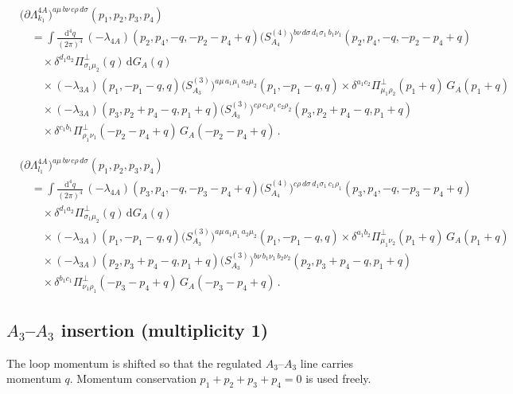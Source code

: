 \documentclass[11pt,a4paper]{article}
\begin{document}
\begin{align}
&\bigl(\partial\Lambda^{4A}_{k_1}\bigr)^{a\mu\,b\nu\,c\rho\,d\sigma}(p_1,p_2,p_3,p_4)
\nonumber\\
&\quad=
\int\frac{\mathrm{d}^4q}{(2\pi)^4}\,
(-\lambda_{4A})(p_2,p_4,-q,-p_2-p_4+q)
\bigl(S^{(4)}_{A_4}\bigr)^{b\nu\,d\sigma\,d_1\sigma_1\,b_1\nu_1}(p_2,p_4,-q,-p_2-p_4+q)
\nonumber\\
&\qquad\times
\delta^{d_1a_2}\Pi^\perp_{\sigma_1\mu_2}(q)\,\mathrm{d}G_A(q)
\nonumber\\
&\qquad\times
(-\lambda_{3A})(p_1,-p_1-q,q)
\bigl(S^{(3)}_{A_3}\bigr)^{a\mu\,a_1\mu_1\,a_2\mu_2}(p_1,-p_1-q,q)
\times
\delta^{a_1c_2}\Pi^\perp_{\mu_1\rho_2}(p_1+q)\,G_A(p_1+q)
\nonumber\\
&\qquad\times
(-\lambda_{3A})(p_3,p_2+p_4-q,p_1+q)
\bigl(S^{(3)}_{A_3}\bigr)^{c\rho\,c_1\rho_1\,c_2\rho_2}(p_3,p_2+p_4-q,p_1+q)
\nonumber\\
&\qquad\times
\delta^{c_1b_1}\Pi^\perp_{\rho_1\nu_1}(-p_2-p_4+q)\,G_A(-p_2-p_4+q)\,.
\label{eq:dLam-k1}
\end{align}

\begin{align}
&\bigl(\partial\Lambda^{4A}_{l_1}\bigr)^{a\mu\,b\nu\,c\rho\,d\sigma}(p_1,p_2,p_3,p_4)
\nonumber\\
&\quad=
\int\frac{\mathrm{d}^4q}{(2\pi)^4}\,
(-\lambda_{4A})(p_3,p_4,-q,-p_3-p_4+q)
\bigl(S^{(4)}_{A_4}\bigr)^{c\rho\,d\sigma\,d_1\sigma_1\,c_1\rho_1}(p_3,p_4,-q,-p_3-p_4+q)
\nonumber\\
&\qquad\times
\delta^{d_1a_2}\Pi^\perp_{\sigma_1\mu_2}(q)\,\mathrm{d}G_A(q)
\nonumber\\
&\qquad\times
(-\lambda_{3A})(p_1,-p_1-q,q)
\bigl(S^{(3)}_{A_3}\bigr)^{a\mu\,a_1\mu_1\,a_2\mu_2}(p_1,-p_1-q,q)
\times
\delta^{a_1b_2}\Pi^\perp_{\mu_1\nu_2}(p_1+q)\,G_A(p_1+q)
\nonumber\\
&\qquad\times
(-\lambda_{3A})(p_2,p_3+p_4-q,p_1+q)
\bigl(S^{(3)}_{A_3}\bigr)^{b\nu\,b_1\nu_1\,b_2\nu_2}(p_2,p_3+p_4-q,p_1+q)
\nonumber\\
&\qquad\times
\delta^{b_1c_1}\Pi^\perp_{\nu_1\rho_1}(-p_3-p_4+q)\,G_A(-p_3-p_4+q)\,.
\label{eq:dLam-l1}
\end{align}

\subsection{$A_3$--$A_3$ insertion (multiplicity 1)}

The loop momentum is shifted so that the regulated $A_3$--$A_3$ line carries
momentum $q$.  Momentum conservation $p_1+p_2+p_3+p_4=0$ is used freely.
\end{document}
